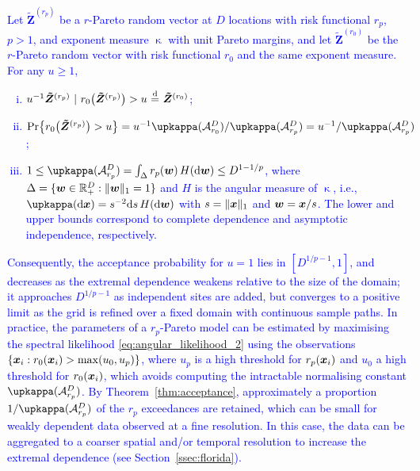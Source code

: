 \documentclass[12pt]{article}
\newcommand{\PZ}{\textcolor{blue}}
\begin{document}
\begin{theorem}\label{thm:acceptance}
\PZ{Let $\bm{\tilde Z}^{(r_p)}$ be a $r$-Pareto random vector at $D$ locations with risk functional $r_p$, $p>1$, and exponent measure $\upkappa$ with unit Pareto margins, and let $\bm{\tilde Z}^{(r_0)}$ be the $r$-Pareto random vector with risk functional $r_0$ and the same exponent measure. For any $u\geq 1$,
\begin{enumerate}[(i)]
\item $u^{-1}\bm{\tilde Z}^{(r_p)}\ |\ r_0\big(\bm{\tilde Z}^{(r_p)}\big)>u\ \eqd\ \bm{\tilde Z}^{(r_0)}$;
\item $\Pr\big\{r_0\big(\bm{\tilde Z}^{(r_p)}\big)>u\big\} = u^{-1}\upkappa(\calA^D_{r_0})/\upkappa(\calA^D_{r_p}) = u^{-1}/\upkappa(\calA^D_{r_p})$;
\item $1\leq \upkappa(\calA^D_{r_p}) = \int_{\Delta}r_p(\bm w)\,H(\text d\bm w)\leq D^{1-1/p}$, where $\Delta=\{\bm w\in{\mathbb R}^D_+:\|\bm w\|_1=1\}$ and $H$ is the angular measure of $\upkappa$, i.e., $\upkappa(\text d\bx)=s^{-2}\text ds\, H(\text d\bm w)$ with $s=\|{\boldsymbol{x}}\|_1$ and $\bm w={\boldsymbol{x}}/s$. The lower and upper bounds correspond to complete dependence and asymptotic independence, respectively. 
\end{enumerate}}
\end{theorem}

\PZ{Consequently, the acceptance probability for $u=1$ lies in $[D^{1/p-1},1]$, and decreases as the extremal dependence weakens relative to the size of the domain; it approaches $D^{1/p-1}$ as independent sites are added, but converges to a positive limit as the grid is refined over a fixed domain with continuous sample paths.
In practice, the parameters of a $r_p$-Pareto model can be estimated by maximising the spectral likelihood \eqref{eq:angular_likelihood_2} using the observations $\{{\boldsymbol{x}}_i: r_0({\boldsymbol{x}}_i)>\max(u_0,u_p)\}$, where $u_p$ is a high threshold for $r_p({\boldsymbol{x}}_i)$ and $u_0$ a high threshold for $r_0({\boldsymbol{x}}_i)$, which avoids computing the intractable normalising constant $\upkappa(\calA^D_{r_p})$. By Theorem~\ref{thm:acceptance}, approximately a proportion $1/\upkappa(\calA^D_{r_p})$ of the $r_p$ exceedances are retained, which can be small for weakly dependent data observed at a fine resolution. In this case, the data can be aggregated to a coarser spatial and/or temporal resolution to increase the extremal dependence (see Section~\ref{ssec:florida}).}

\end{document}
